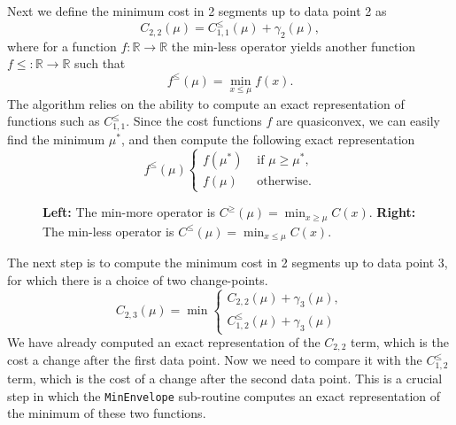 \documentclass{article}
\newcommand{\RR}{\mathbb R}
\begin{document}
Next we define the minimum cost in 2 segments up to data point 2 as
\begin{equation*}
  \label{eq:C22}
  C_{2,2}(\mu) = C_{1,1}^{\leq}(\mu) + \gamma_2(\mu),
\end{equation*}
where for a function $f:\RR\rightarrow\RR$ the min-less operator
yields another function $f\leq:\RR\rightarrow\RR$ such that
\begin{equation}
  \label{eq:min-less}
  f^{\leq}(\mu) = \min_{x\leq \mu} f(x).
\end{equation}
The algorithm relies on the ability to compute an exact representation
of functions such as $C_{1,1}^{\leq}$. Since the cost functions $f$
are quasiconvex, we can easily find the minimum $\mu^*$, and then
compute the following exact representation
\begin{equation*}
  f^\leq(\mu)
  \begin{cases}
    f(\mu^*) & \text{ if } \mu \geq \mu^*,\\
    f(\mu) & \text{ otherwise.}
  \end{cases}
\end{equation*}

\begin{figure}[!t]
  \parbox{3in}{
    \begin{center}
    
    \end{center}
  }
  \parbox{3in}{
    \begin{center}
      
    \end{center}
  }
  \caption{\label{fig:min-operators} \textbf{Left:} The min-more
    operator is $C^{\geq}(\mu)=\min_{x\geq \mu}C(x)$. \textbf{Right:}
    The min-less operator is $C^{\leq}(\mu)=\min_{x\leq
      \mu}C(x)$.}
\end{figure}

The next step is to compute the minimum cost in 2 segments up to data
point 3, for which there is a choice of two change-points.
\begin{equation*}
  C_{2,3}(\mu) = \min
  \begin{cases}
    C_{2,2}(\mu)+\gamma_3(\mu), \\
    C_{1,2}^{\leq}(\mu)+\gamma_3(\mu)
  \end{cases}
\end{equation*}
We have already computed an exact representation of the $C_{2,2}$
term, which is the cost a change after the first data point. Now we
need to compare it with the $C_{1,2}^{\leq}$ term, which is the cost
of a change after the second data point. This is a crucial step in
which the \texttt{MinEnvelope} sub-routine computes an exact
representation of the minimum of these two functions.
\end{document}

